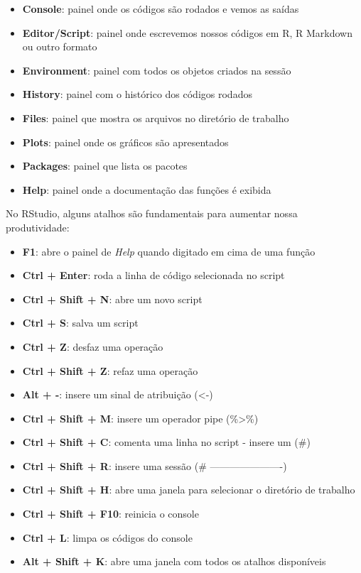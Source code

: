 \documentclass[
]{book}
\providecommand{\tightlist}{%
  \setlength{\itemsep}{0pt}\setlength{\parskip}{0pt}}
\begin{document}
\begin{itemize}
\tightlist
\item
  \textbf{Console}: painel onde os códigos são rodados e vemos as saídas
\item
  \textbf{Editor/Script}: painel onde escrevemos nossos códigos em R, R Markdown ou outro formato
\item
  \textbf{Environment}: painel com todos os objetos criados na sessão
\item
  \textbf{History}: painel com o histórico dos códigos rodados
\item
  \textbf{Files}: painel que mostra os arquivos no diretório de trabalho
\item
  \textbf{Plots}: painel onde os gráficos são apresentados
\item
  \textbf{Packages}: painel que lista os pacotes
\item
  \textbf{Help}: painel onde a documentação das funções é exibida
\end{itemize}

No RStudio, alguns atalhos são fundamentais para aumentar nossa produtividade:

\begin{itemize}
\tightlist
\item
  \textbf{F1}: abre o painel de \emph{Help} quando digitado em cima de uma função
\item
  \textbf{Ctrl + Enter}: roda a linha de código selecionada no script
\item
  \textbf{Ctrl + Shift + N}: abre um novo script
\item
  \textbf{Ctrl + S}: salva um script
\item
  \textbf{Ctrl + Z}: desfaz uma operação
\item
  \textbf{Ctrl + Shift + Z}: refaz uma operação
\item
  \textbf{Alt + -}: insere um sinal de atribuição (\textless-)
\item
  \textbf{Ctrl + Shift + M}: insere um operador pipe (\%\textgreater\%)
\item
  \textbf{Ctrl + Shift + C}: comenta uma linha no script - insere um (\#)
\item
  \textbf{Ctrl + Shift + R}: insere uma sessão (\# ----------------------)
\item
  \textbf{Ctrl + Shift + H}: abre uma janela para selecionar o diretório de trabalho
\item
  \textbf{Ctrl + Shift + F10}: reinicia o console
\item
  \textbf{Ctrl + L}: limpa os códigos do console
\item
  \textbf{Alt + Shift + K}: abre uma janela com todos os atalhos disponíveis
\end{itemize}
\end{document}
